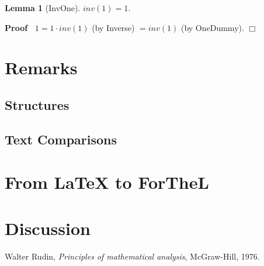 \documentclass{article}
\newenvironment{forthel}{\begin{leftbar}}{\end{leftbar}}
\newenvironment{proof}{\noindent\textbf{Proof\ }}{\hspace*{\fill}$\Box$\medskip}
\newtheorem{lemma}{Lemma}
\newcommand{\dotequal}{=}
\begin{document}
\begin{forthel}
	
	\begin{lemma}[InvOne]
	$inv(1) = 1$.
	\end{lemma}
	\begin{proof}
	$1 \dotequal 1 \cdot inv(1)$ (by Inverse)
	$\dotequal inv(1)$ (by OneDummy).
	\end{proof}   
	
\end{forthel}


\section{Remarks}
\subsection{Structures}


\subsection{Text Comparisons}



\section{{From \LaTeX} to ForTheL}



\section{Discussion}


\begin{thebibliography}{1}

  Walter Rudin,
  \textit{Principles of mathematical analysis},
  McGraw-Hill,
  1976.

\end{thebibliography}
  
\end{document}
